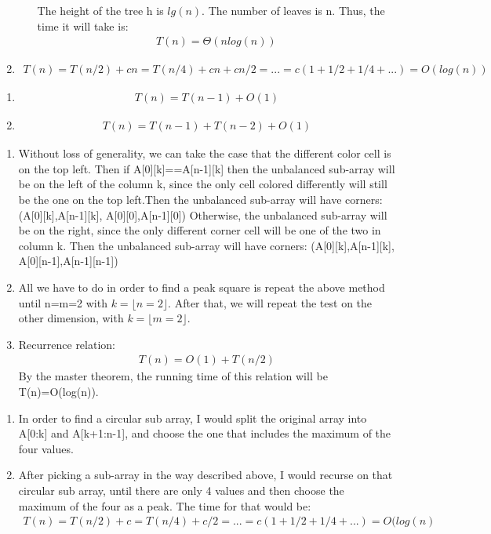 \documentclass[12pt,twoside]{article}
\begin{document}
\begin{problems}
\begin{problemparts}
\begin{enumerate}
\begin{itemize}
The height of the tree h is $lg(n)$. The number of leaves is n. Thus, the time it will take is: 
\begin{align}
T(n)=\Theta(nlog(n))
\end{align}
\end{itemize}
\item
\begin{align}
T(n)=T(n/2)+cn=T(n/4)+cn+cn/2=...=c(1+1/2+1/4+...)=O(log(n))
\end{align}
\end{enumerate}
\problempart 
\begin{enumerate}
\item
\begin{align}
T(n)=T(n-1)+O(1)
\end{align}
\item
\begin{align}
T(n)=T(n-1)+T(n-2)+O(1)
\end{align}
\end{enumerate}
\end{problemparts}

\problem  %

\begin{problemparts}
\problempart 
\begin{enumerate}
\item
Without loss of generality, we can take the case that the different color cell is on the top left. Then if A[0][k]==A[n-1][k] then the unbalanced sub-array will be on the left of the column k, since the only cell colored differently will still be the one on the top left.Then the unbalanced sub-array will have corners: (A[0][k],A[n-1][k], A[0][0],A[n-1][0]) Otherwise, the unbalanced sub-array will be on the right, since the only different corner cell will be one of the two in column k. Then the unbalanced sub-array will have corners: (A[0][k],A[n-1][k], A[0][n-1],A[n-1][n-1])
\item
All we have to do in order to find a peak square is repeat the above method until n=m=2 with $k=\lfloor n=2 \rfloor$. After that, we will repeat the test on the other dimension, with $k=\lfloor m=2 \rfloor$.
\item
Recurrence relation:
\begin{align}
T(n)=O(1)+T(n/2)
\end{align}
By the master theorem, the running time of this relation will be T(n)=O(log(n)).
\end{enumerate}
\problempart 
\begin{enumerate}
\item
In order to find a circular sub array, I would split the original array into A[0:k] and A[k+1:n-1], and choose the one that includes the maximum of the four values.
\item
After picking a sub-array in the way described above, I would recurse on that circular sub array, until there are only 4 values and then choose the maximum of the four as a peak.
The time for that would be:
\begin{align}
T(n)=T(n/2)+c=T(n/4)+c/2=...=c(1+1/2+1/4+...)=O(log(n)
\end{align}


\end{enumerate}
\end{problemparts}
\end{problems}
\end{document}
